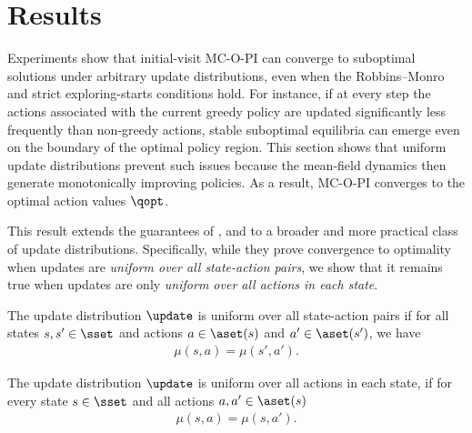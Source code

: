 \section{Results}
\label{sec: results}



Experiments show that initial-visit MC-O-PI can converge to suboptimal solutions under arbitrary update distributions, even when the Robbins–Monro 
and strict exploring-starts conditions hold.
For instance, if at every step the actions associated with the current greedy policy are updated significantly less frequently than non-greedy actions, stable suboptimal equilibria can emerge even on the boundary of the optimal policy region.
This section shows that uniform update distributions prevent such issues because the mean-field dynamics then generate monotonically improving policies.
As a result, MC-O-PI converges to the optimal action values $\qopt$.

This result extends the guarantees of \citet{Tsitsiklis2002OnIteration}, \citet{Chen2018OnProblem} and \citet{Liu2021OnStarts} to a broader and more practical class of update distributions.
Specifically, while they prove convergence to optimality when updates are \textit{uniform over all state-action pairs}, we show that it remains true when updates are only \textit{uniform over all actions in each state}.

\begin{definition}
\label{asp: unbiased tsitsiklis}
The update distribution $\update$ is uniform over all state-action pairs
if for all states $s, s' \in \sset$ and actions $a \in \aset(s)$ and $a' \in \aset(s')$, we have
\begin{align*}
    \mu(s, a) = \mu(s', a') .
\end{align*}
\end{definition}

\begin{definition}
\label{asp: unbiased over policies}
The update distribution $\update$ is uniform over all actions in each state,
if for every state $s \in \sset$ and all actions $a, a' \in \aset(s)$
\begin{align*}
    \mu(s, a) = \mu(s, a') .
\end{align*}
\end{definition}

